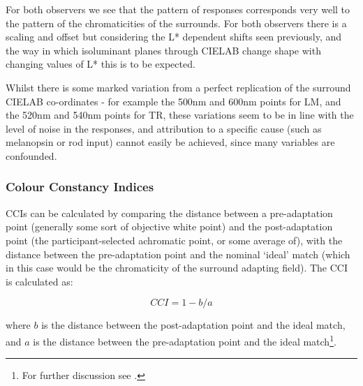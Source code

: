 For both observers we see that the pattern of responses corresponds very well to the pattern of the chromaticities of the surrounds. For both observers there is a scaling and offset but considering the L* dependent shifts seen previously, and the way in which isoluminant planes through CIELAB change shape with changing values of L* this is to be expected.

Whilst there is some marked variation from a perfect replication of the surround CIELAB co-ordinates - for example the 500nm and 600nm points for LM, and the 520nm and 540nm points for TR, these variations seem to be in line with the level of noise in the responses, and attribution to a specific cause (such as melanopsin or rod input) cannot easily be achieved, since many variables are confounded.


\subsubsection{Colour Constancy Indices}

\Glspl{CCI} can be calculated by comparing the distance between a pre-adaptation point (generally some sort of objective white point) and the post-adaptation point (the participant-selected achromatic point, or some average of), with the distance between the pre-adaptation point and the nominal `ideal' match (which in this case would be the chromaticity of the surround adapting field). The \gls{CCI} is calculated as:

\begin{equation}
CCI = 1-b/a
\label{eq:CCI}
\end{equation}

where $b$ is the distance between the post-adaptation point and the ideal match, and $a$ is the distance between the pre-adaptation point and the ideal match\footnote{For further discussion see \citet[Section 4.1, pg. 681]{foster_color_2011}.}.

